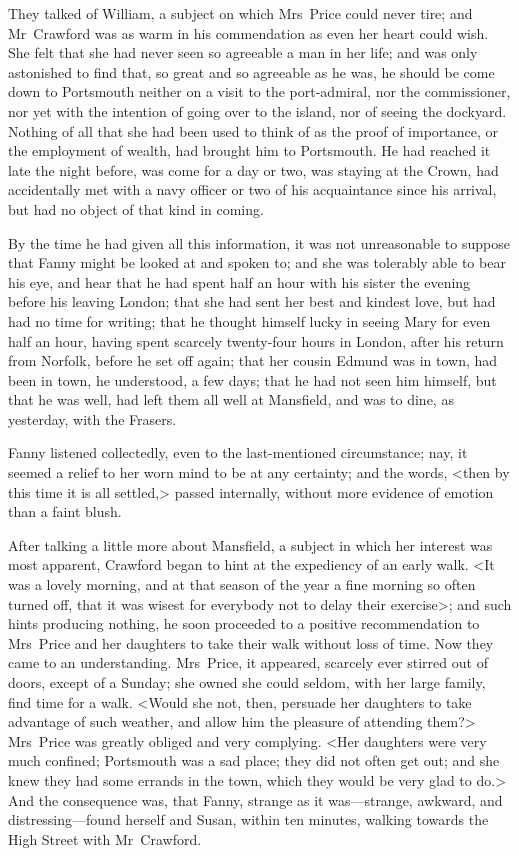 They talked of William, a subject on which Mrs~Price could never tire; and Mr~Crawford was as warm in his commendation as even her heart could wish. She felt that she had never seen so agreeable a man in her life; and was only astonished to find that, so great and so agreeable as he was, he should be come down to Portsmouth neither on a visit to the port-admiral, nor the commissioner, nor yet with the intention of going over to the island, nor of seeing the dockyard. Nothing of all that she had been used to think of as the proof of importance, or the employment of wealth, had brought him to Portsmouth. He had reached it late the night before, was come for a day or two, was staying at the Crown, had accidentally met with a navy officer or two of his acquaintance since his arrival, but had no object of that kind in coming.

By the time he had given all this information, it was not unreasonable to suppose that Fanny might be looked at and spoken to; and she was tolerably able to bear his eye, and hear that he had spent half an hour with his sister the evening before his leaving London; that she had sent her best and kindest love, but had had no time for writing; that he thought himself lucky in seeing Mary for even half an hour, having spent scarcely twenty-four hours in London, after his return from Norfolk, before he set off again; that her cousin Edmund was in town, had been in town, he understood, a few days; that he had not seen him himself, but that he was well, had left them all well at Mansfield, and was to dine, as yesterday, with the Frasers.

Fanny listened collectedly, even to the last-mentioned circumstance; nay, it seemed a relief to her worn mind to be at any certainty; and the words, <then by this time it is all settled,> passed internally, without more evidence of emotion than a faint blush.

After talking a little more about Mansfield, a subject in which her interest was most apparent, Crawford began to hint at the expediency of an early walk. <It was a lovely morning, and at that season of the year a fine morning so often turned off, that it was wisest for everybody not to delay their exercise>; and such hints producing nothing, he soon proceeded to a positive recommendation to Mrs~Price and her daughters to take their walk without loss of time. Now they came to an understanding. Mrs~Price, it appeared, scarcely ever stirred out of doors, except of a Sunday; she owned she could seldom, with her large family, find time for a walk. <Would she not, then, persuade her daughters to take advantage of such weather, and allow him the pleasure of attending them?> Mrs~Price was greatly obliged and very complying. <Her daughters were very much confined; Portsmouth was a sad place; they did not often get out; and she knew they had some errands in the town, which they would be very glad to do.> And the consequence was, that Fanny, strange as it was—strange, awkward, and distressing—found herself and Susan, within ten minutes, walking towards the High Street with Mr~Crawford.

